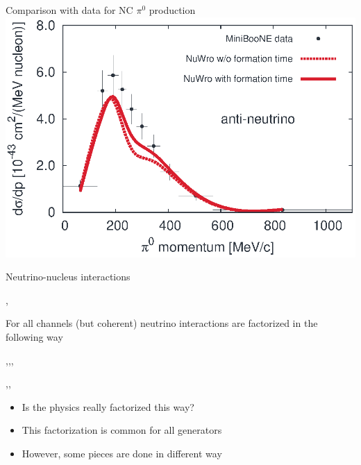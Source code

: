 \begin{wideslide}[toc=]{Comparison with data for NC $\pi^0$ production}
  \includegraphics[width = 0.425\slidewidth]{img/mba.eps}
 
\end{wideslide}


\begin{wideslide}[toc=Summary]{Neutrino-nucleus interactions}
\null\vfill

  \sep

  For all channels (but coherent) neutrino interactions are factorized in the following way
  
  \sep\sep\sep
  
  \centering
  
  \sep\sep
  
  \begin{itemize}
   \item Is the physics really factorized this way?
   \item This factorization is common for all generators
   \item However, some pieces are done in different way
  \end{itemize}
  
\vfill\null
\end{wideslide}
